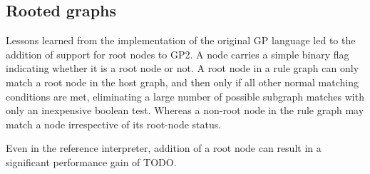 \subsection{Rooted graphs}

Lessons learned from the implementation of the original GP language led to the addition of support for root nodes to GP2. A node carries a simple binary flag indicating whether it is a root node or not. A root node in a rule graph can only match a root node in the host graph, and then only if all other normal matching conditions are met, eliminating a large number of possible subgraph matches with only an inexpensive boolean test. Whereas a non-root node in the rule graph may match a node irrespective of its root-node status.


Even in the reference interpreter, addition of a root node can result in a significant performance gain of TODO.

